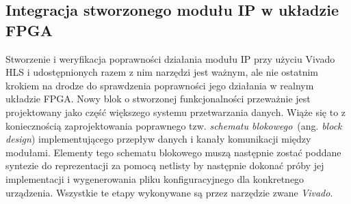 \subsection{Integracja stworzonego modułu IP w układzie FPGA}
Stworzenie i weryfikacja poprawności działania modułu IP przy użyciu Vivado HLS i udostępnionych razem z nim narzędzi jest ważnym, ale nie ostatnim krokiem na drodze do sprawdzenia poprawności jego działania w realnym układzie FPGA. Nowy blok o stworzonej funkcjonalności przeważnie jest projektowany jako część większego systemu przetwarzania danych. Wiąże się to z koniecznością zaprojektowania poprawnego tzw. \textit{schematu blokowego}~(ang. \textit{block design}) implementującego przepływ danych i kanały komunikacji między modułami. Elementy tego schematu blokowego muszą następnie zostać poddane syntezie do reprezentacji za pomocą netlisty by następnie dokonać próby jej implementacji i wygenerowania pliku konfiguracyjnego dla konkretnego urządzenia. Wszystkie te etapy wykonywane są przez narzędzie zwane \textit{Vivado}.
